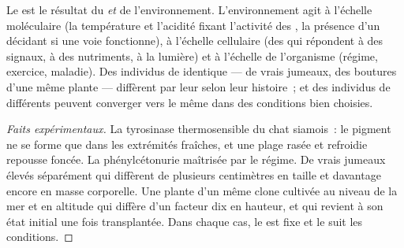 \begin{proposition}\label{prop:g11:enzymes-and-phenotype:environment}
Le  est le résultat du  \emph{et} de l'environnement.
L'environnement agit à l'échelle moléculaire (la température et
l'acidité fixant l'activité des , la présence d'un 
décidant si une voie fonctionne), à l'échelle cellulaire (des 
qui répondent à des signaux, à des nutriments, à la lumière) et à
l'échelle de l'organisme (régime, exercice, maladie). Des individus de
 identique --- de vrais jumeaux, des boutures d'une même plante
--- diffèrent par leur  selon leur histoire~; et des individus
de  différents peuvent converger vers le même  dans
des conditions bien choisies.
\end{proposition}
\begin{proof}[Faits expérimentaux]
La tyrosinase thermosensible du chat siamois~: le pigment ne se forme
que dans les extrémités fraîches, et une plage rasée et refroidie
repousse foncée. La phénylcétonurie maîtrisée par le régime. De vrais
jumeaux élevés séparément qui diffèrent de plusieurs centimètres en
taille et davantage encore en masse corporelle. Une plante d'un même
clone cultivée au niveau de la mer et en altitude qui diffère d'un
facteur dix en hauteur, et qui revient à son état initial une fois
transplantée. Dans chaque cas, le  est fixe et le 
suit les conditions.
\end{proof}

